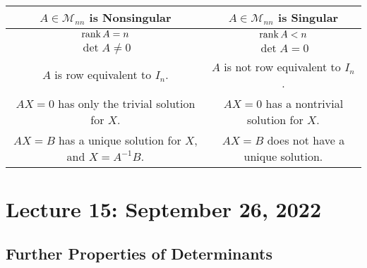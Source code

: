         \begin{center}
            \begin{tabular}{||c|c||}
                \hline
                \hline
                \(A\in\mathcal{M}_{nn}\) is Nonsingular & \(A\in\mathcal{M}_{nn}\) is Singular \\
                \hline
                \hline
                \(\text{rank\,} A = n\) & \(\text{rank\,} A < n\) \\
                \(\det A \neq 0\) & \(\det A = 0\) \\
                \(A\) is row equivalent to \(I_n\). & \(A\) is not row equivalent to \(I_n\). \\
                \(AX=0\) has only the trivial solution for \(X\). & \(AX=0\) has a nontrivial solution for \(X\). \\
                \(AX=B\) has a unique solution for \(X\), and \(X=A^{-1}B\). & \(AX=B\) does not have a unique solution. \\
                \hline
            \end{tabular}
        \end{center}

\pagebreak

\section{Lecture 15: September 26, 2022}

    \subsection{Further Properties of Determinants}

